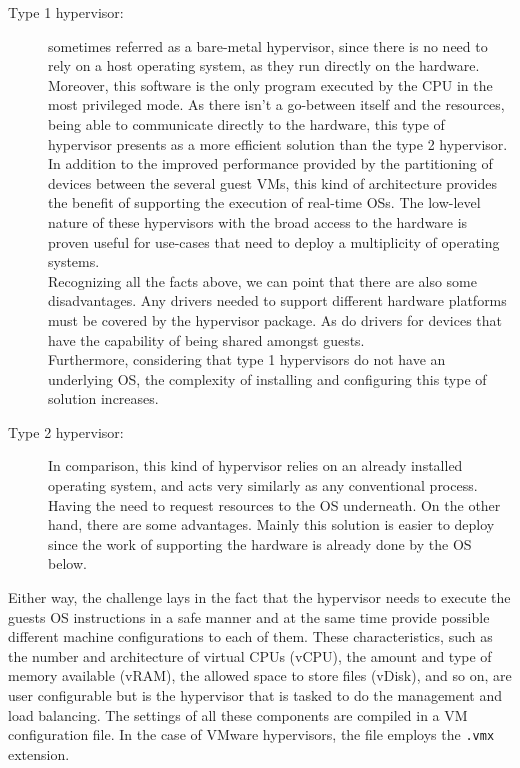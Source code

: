 \begin{description}
	\item [Type 1 hypervisor:] sometimes referred as a bare-metal hypervisor, since there is no need to rely on a host operating system, as they run directly on the hardware. Moreover, this software is the only program executed by the CPU in the most privileged mode. As there isn't a go-between itself and the resources, being able to communicate directly to the hardware, this type of hypervisor presents as a more efficient solution than the type 2 hypervisor.\\ In addition to the improved performance provided by the partitioning of devices between the several guest VMs, this kind of architecture provides the benefit of supporting the execution of real-time OSs. The low-level nature of these hypervisors with the broad access to the hardware is proven useful for use-cases that need to deploy a multiplicity of operating systems.\\ Recognizing all the facts above, we can point that there are also some disadvantages. Any drivers needed to support different hardware platforms must be covered by the hypervisor package. As do drivers for devices that have the capability of being shared amongst guests.\\ Furthermore, considering that type 1 hypervisors do not have an underlying OS, the complexity of installing and configuring this type of solution increases.
	\item [Type 2 hypervisor:] In comparison, this kind of hypervisor relies on an already installed operating system, and acts very similarly as any conventional process. Having the need to request resources to the OS underneath. On the other hand, there are some advantages. Mainly this solution is easier to deploy since the work of supporting the hardware is already done by the OS below.
\end{description}

Either way, the challenge lays in the fact that the hypervisor needs to execute the guests OS instructions in a safe manner and at the same time provide possible different machine configurations to each of them. These characteristics, such as the number and architecture of virtual CPUs (vCPU), the amount and type of memory available (vRAM), the allowed space to store files (vDisk), and so on, are user configurable but is the hypervisor that is tasked to do the management and load balancing. The settings of all these components are compiled in a VM configuration file. In the case of VMware hypervisors, the file employs the \texttt{.vmx} extension.\cite{VMWare_VMFiles,Portnoy2012}

